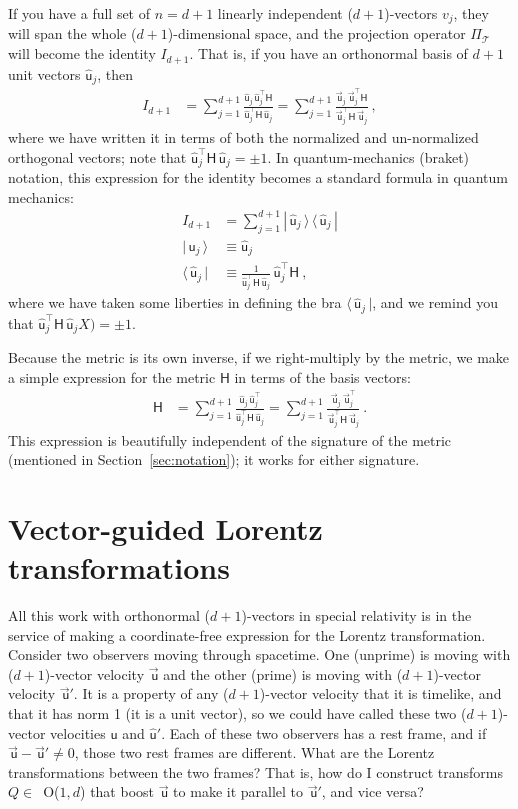 \documentclass{article}
\newcommand{\metric}{\mathsf{H}}
\newcommand{\proj}{\mathsf{\Pi}}
\newcommand\upvec[1]{\!\vec{\,\mathrm{#1}}}
\newcommand{\Lvec}[1]{\upvec{\mathsf{#1}}} %
\newcommand{\Lhat}[1]{\hat{\mathsf{#1}}} %
\newcommand{\bra}[1]{\langle\,{#1}\,|}
\newcommand{\ket}[1]{|\,{#1}\,\rangle}
\newcommand{\ketbra}[2]{|\,{#1}\,\rangle\,\langle\,{#2}\,|}
\newcommand{\plus}{\!+\!} %
\newcommand{\secref}[1]{Section~\ref{#1}}
\begin{document}
If you have a full set of $n=d+1$ linearly independent ($d\plus1$)-vectors $v_j$, they will span the whole ($d\plus1$)-dimensional space, and the projection operator $\proj_\mathscr{T}$ will become the identity $I_{d+1}$.
That is, if you have an orthonormal basis of $d+1$ unit vectors $\Lhat{u}_j$, then
\begin{align}
    I_{d+1} &= \sum_{j=1}^{d+1} \frac{\Lhat{u}_j\,\Lhat{u}_j^\top\metric}{\Lhat{u}_j^\top\metric\,\Lhat{u}_j} = \sum_{j=1}^{d+1} \frac{\Lvec{u}_j\,\Lvec{u}_j^\top\metric}{\Lvec{u}_j^\top\metric\,\Lvec{u}_j} ~,
\end{align}
where we have written it in terms of both the normalized and un-normalized orthogonal vectors; note that $\Lhat{u}_j^\top\metric\,\Lhat{u}_j=\pm 1$.
In quantum-mechanics (braket) notation, this expression for the identity becomes a standard formula in quantum mechanics:
\begin{align}
    I_{d+1} &= \sum_{j=1}^{d+1} \ketbra{\Lhat{u}_j}{\Lhat{u}_j}
    \\
    \ket{\Lhat{u}_j} &\equiv \Lhat{u}_j\label{eq:Lket}
    \\
    \bra{\Lhat{u}_j} &\equiv \frac{1}{\Lhat{u}_j^\top\metric\,\Lhat{u}_j}\,\Lhat{u}_j^\top\metric ~,\label{eq:Lbra}
\end{align}
where we have taken some liberties in defining the bra $\bra{\Lhat{u}_j}$, and we remind you that $\Lhat{u}_j^\top\metric\,\Lhat{u}_jX)=\pm 1$.

Because the metric is its own inverse, if we right-multiply by the metric, we make a simple expression for the metric $\metric$ in terms of the basis vectors:
\begin{align}
    \metric &= \sum_{j=1}^{d+1} \frac{\Lhat{u}_j\,\Lhat{u}_j^\top}{\Lhat{u}_j^\top\metric\,\Lhat{u}_j} = \sum_{j=1}^{d+1} \frac{\Lvec{u}_j\,\Lvec{u}_j^\top}{\Lvec{u}_j^\top\metric\,\Lvec{u}_j} ~.
\end{align}
This expression is beautifully independent of the signature of the metric (mentioned in \secref{sec:notation}); it works for either signature.

\section{Vector-guided Lorentz transformations}\label{sec:lt}

All this work with orthonormal ($d\plus1$)-vectors in special relativity is in the service of making a coordinate-free expression for the Lorentz transformation.
Consider two observers moving through spacetime.
One (unprime) is moving with ($d\plus1$)-vector velocity $\Lvec{u}$ and the other (prime) is moving with ($d\plus1$)-vector velocity $\Lvec{u}'$.
It is a property of any ($d\plus1$)-vector velocity that it is timelike, and that it has norm 1 (it is a unit vector), so we could have called these two ($d\plus1$)-vector velocities $\Lhat{u}$ and $\Lhat{u}'$.
Each of these two observers has a rest frame, and if $\Lvec{u}-\Lvec{u}'\neq 0$, those two rest frames are different.
What are the Lorentz transformations between the two frames?
That is, how do I construct transforms $Q\in$~O($1,d$) that boost $\Lvec{u}$ to make it parallel to $\Lvec{u}'$, and vice versa?
\end{document}
